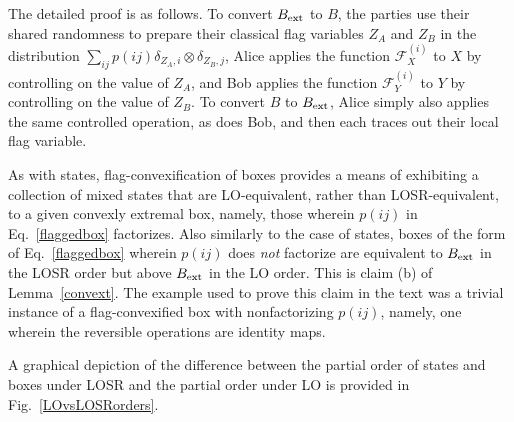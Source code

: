 \documentclass[prx,11pt,letterpaper,twocolumn,accepted=2023-11-27]{quantumarticle}
\theoremstyle{plain}
\theoremstyle{definition}
\begin{document}
\begin{appendices}
The detailed proof 
 is as follows.   To convert $B_{\rm ext}$ to $B$, the parties use their shared randomness to prepare their classical flag variables $Z_A$ and $Z_B$ in the distribution ${\sum_{ij} p(ij) \delta_{Z_A,i} \otimes \delta_{Z_B,j}}$, Alice applies the function $\mathcal{F}^{(i)}_{X}$ to $X$ by controlling on the value of $Z_A$, and Bob applies the function $\mathcal{F}^{(i)}_{Y}$ to $Y$ by controlling on the value of $Z_B$. To convert $B$ to $B_{\rm ext}$, Alice simply also applies the same controlled operation, as does Bob, and then each traces out their local flag variable.

As with states, flag-convexification of boxes provides a means of exhibiting a collection of mixed states that are LO-equivalent, rather than LOSR-equivalent, to a given convexly extremal box, namely, those wherein $p(ij)$ in Eq.~\eqref{flaggedbox} factorizes.  Also similarly to the case of states, boxes of the form of Eq.~\eqref{flaggedbox} wherein $p(ij)$ does {\em not} factorize are equivalent to $B_{\rm ext}$ in the LOSR order but above $B_{\rm ext}$ in the LO order.  This is claim (b) of Lemma~\ref{convext}.  The example used to prove this claim in the text was a trivial instance of a flag-convexified box with nonfactorizing $p(ij)$, namely, one wherein the reversible operations are identity maps. 


A graphical depiction of the difference between the partial order of states and boxes under LOSR and the partial order under LO is provided in Fig.~\ref{LOvsLOSRorders}.
 

\end{appendices}
\end{document}
